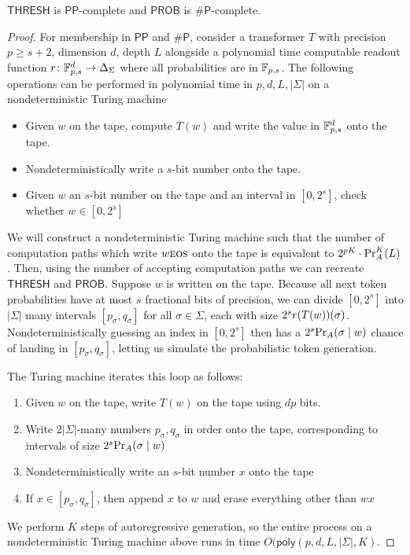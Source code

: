 \documentclass[acmsmall,screen,review,anonymous,nonacm]{PLDI/acmart}
\begin{document}
\begin{theorem}
    $\mathsf{THRESH}$ is $\mathsf{PP}$-complete and  $\mathsf{PROB}$ is $\#\mathsf{P}$-complete.
\end{theorem}
\begin{proof}
    For membership in $\mathsf{PP}$ and $\mathsf{\#P}$, consider a transformer $T$ with precision $p\geq s+2$, dimension $d$, depth $L$ alongside a polynomial time computable readout function ${r}\colon \mathbb{F}_{p,s}^d\to \Delta_{\Sigma}$ where all probabilities are in $\mathbb{F}_{p,s}$.
    The following operations can be performed in polynomial time in $p,d,L,|\Sigma|$ on a nondeterministic Turing machine
    \begin{itemize}
        \item Given $w$ on the tape, compute $T(w)$ and write the value in $\mathbb{F}_{p,s}^d$ onto the tape. 
        \item Nondeterministically write a $s$-bit number onto the tape. 
        \item Given $w$ an $s$-bit number on the tape and an interval in $[0,2^s]$, check whether $w\in[0,2^s]$
    \end{itemize}
    We will construct a nondeterministic Turing machine such that the number of computation paths which write $w{{\textsc{eos}}}$ onto the tape is equivalent to $2^{pK}\cdot {\textnormal{Pr}^{K}_{{A}}(L)}$. 
    Then, using the number of accepting computation paths we can recreate $\mathsf{THRESH}$ and $\mathsf{PROB}$.
    Suppose $w$ is written on the tape. 
    Because all next token probabilities have at most $s$ fractional bits of precision, we can divide $[0,2^s]$ into $|\Sigma|$ many intervals $[p_\sigma,q_\sigma]$ for all $\sigma\in\Sigma$, each with size $2^s{r}(T(w))(\sigma)$.
    Nondeterministically guessing an index in $[0,2^s]$ then has a $2^s{\textnormal{Pr}_{{A}}(\sigma \mid w)}$ chance of landing in $[p_\sigma,q_\sigma]$, letting us simulate the probabilistic token generation.
    
    The Turing machine iterates this loop as follows:
    \begin{enumerate}
        \item Given $w$ on the tape, write $T(w)$ on the tape using $dp$ bits.
        \item Write $2|\Sigma|$-many numbers $p_\sigma,q_\sigma$ in order onto the tape, corresponding to intervals of size $2^s{\textnormal{Pr}_{{A}}(\sigma \mid w)}$
        \item Nondeterministically write an $s$-bit number $x$ onto the tape
        \item If $x\in[p_\sigma,q_\sigma]$, then append $x$ to $w$ and erase everything other than $wx$
    \end{enumerate}
    We perform $K$ steps of autoregressive generation, so the entire process on a nondeterministic Turing machine above runs in time $O(\mathsf{poly}(p,d,L,|\Sigma|,K)$.
    

\end{proof}
\end{document}
